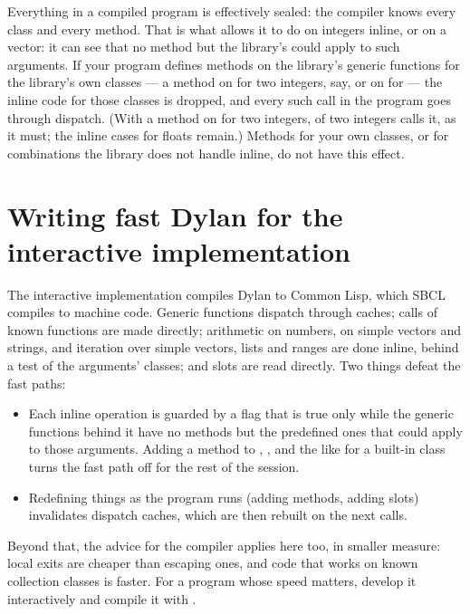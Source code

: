Everything in a compiled program is effectively sealed: the compiler
knows every class and every method. That is what allows it to do
\code{+} on integers inline, or  on a vector: it can see
that no method but the library's could apply to such arguments. If your
program defines methods on the library's generic functions for the
library's own classes --- a method on  for two integers,
say, or on  for  --- the
inline code for those classes is dropped, and every such call in the
program goes through dispatch. (With a method on  for two
integers, \code{+} of two integers calls it, as it must; the inline
cases for floats remain.) Methods for your own classes, or for
combinations the library does not handle inline, do not have this
effect.

\section{Writing fast Dylan for the interactive implementation}
\label{sec:perf-lisp}

The interactive implementation compiles Dylan to Common Lisp, which SBCL
compiles to machine code. Generic functions dispatch through caches;
calls of known functions are made directly; arithmetic on numbers,
 on simple vectors and strings, and iteration over simple
vectors, lists and ranges are done inline, behind a test of the
arguments' classes; and slots are read directly. Two things defeat the
fast paths:

\begin{itemize}
\item Each inline operation is guarded by a flag that is true only while
  the generic functions behind it have no methods but the predefined
  ones that could apply to those arguments. Adding a method to
  \code{+}, , \code{<} and the like for a built-in class
  turns the fast path off for the rest of the session.
\item Redefining things as the program runs (adding methods, adding
  slots) invalidates dispatch caches, which are then rebuilt on the next
  calls.
\end{itemize}

Beyond that, the advice for the compiler applies here too, in smaller
measure: local exits are cheaper than escaping ones, and code that works
on known collection classes is faster. For a program whose speed matters,
develop it interactively and compile it with .

